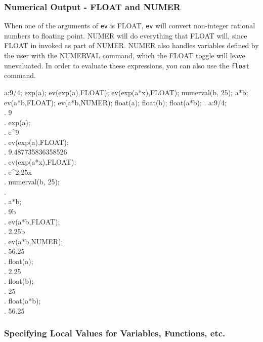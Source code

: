 \subsubsection{Numerical Output - FLOAT and NUMER}

When one of the arguments of \texttt{ev} is FLOAT, \texttt{ev} will
convert non-integer rational numbers to floating point. NUMER will
do everything that FLOAT will, since FLOAT in invoked as part of NUMER.
NUMER also handles variables defined by the user with the NUMERVAL command,
which the FLOAT toggle will leave unevaluated.  In order to evaluate these
expressions, you can also use the \texttt{float} command.

\vspace{3ex}

\label{FLOAT/NUMER example (Example 9)}

\beginmaximasession
a:9/4;
exp(a);
ev(exp(a),FLOAT);
ev(exp(a*x),FLOAT);
numerval(b, 25);
a*b;
ev(a*b,FLOAT);
ev(a*b,NUMER);
float(a);
float(b);
float(a*b);
\maximatexsession
{}.  a:9/4; \\
.   {{9}} \\
.  exp(a); \\
.   e^{{{9}}} \\
.  ev(exp(a),FLOAT); \\
.   9.487735836358526 \\
.  ev(exp(a*x),FLOAT); \\
.   e^{2.25\*x} \\
.  numerval(b, 25); \\
.   \left[ b \right]  \\
.  a*b; \\
.   {{9\*b}} \\
.  ev(a*b,FLOAT); \\
.   2.25\*b \\
.  ev(a*b,NUMER); \\
.   56.25 \\
.  float(a); \\
.   2.25 \\
.  float(b); \\
.   25 \\
.  float(a*b); \\
.   56.25 \\
\endmaximasession

\vspace{3ex}

\subsubsection{Specifying Local Values for Variables, Functions, etc.}

